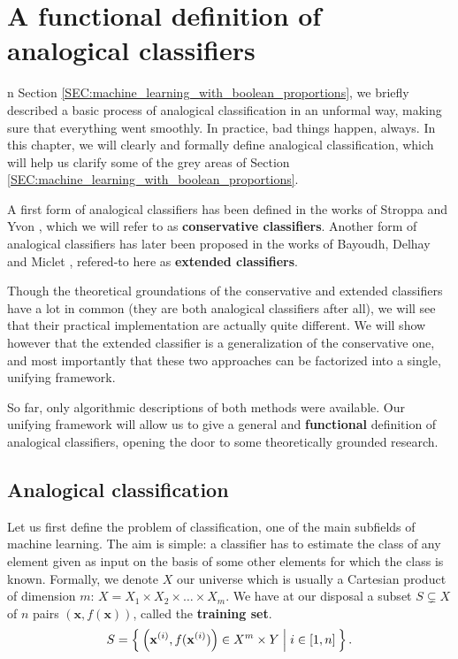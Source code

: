 \chapter{A functional definition of analogical classifiers}
\label{CHAP:functional_definition}

n Section \ref{SEC:machine_learning_with_boolean_proportions}, we
briefly described a basic process of analogical classification in an unformal
way, making sure that everything went smoothly. In practice, bad things happen,
always. In this chapter, we will clearly and formally define analogical
classification, which will help us clarify some of the grey areas of Section
\ref{SEC:machine_learning_with_boolean_proportions}.

A first form of analogical classifiers has been defined in the works of Stroppa
and Yvon \cite{StrYvoCNLL05}, which we will refer to as \textbf{conservative
classifiers}. Another form of analogical classifiers has later been proposed in
the works of Bayoudh, Delhay and Miclet \cite{MicBayDelJAIR08,
BayMicDelIJCAI07}, refered-to here as \textbf{extended classifiers}.

Though the theoretical groundations of the conservative and extended
classifiers have a lot in common (they are both analogical classifiers after
all), we will see that their practical implementation are actually quite
different. We will show however that the extended classifier is a
generalization of the conservative one, and most importantly that these two
approaches can be factorized into a single, unifying framework.

So far, only algorithmic descriptions of both methods were available. Our
unifying framework will allow us to give a general and \textbf{functional}
definition of analogical classifiers, opening the door to some theoretically
grounded research.

\section{Analogical classification}

Let us first define the problem of classification, one of the main subfields of
machine learning. The aim is simple: a classifier has to estimate the class of
any element given as input on the basis of some other elements for which the
class is known. Formally, we denote $X$ our universe which is usually a
Cartesian product of dimension $m$: $X = X_1 \times X_2 \times \ldots \times
X_m$. We have at our disposal a subset $S \subsetneq X$ of $n$ pairs
$\left(\mathbf{x}, f(\mathbf{x})\right)$, called the \textbf{training set}.
$$S= \Set{\left(\mathbf{x}^{(i)}, f(\mathbf{x}^{(i)})\right) \in X^m \times Y |
i \in [1,n]}.$$

